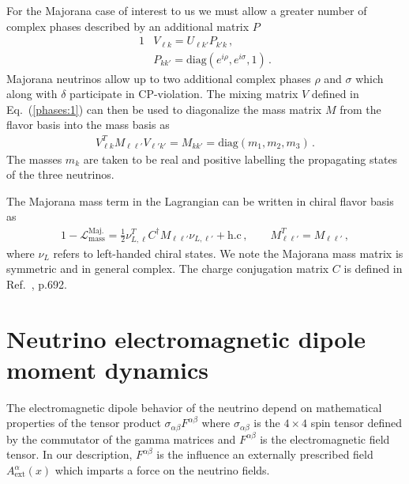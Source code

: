 \documentclass[addchapnum]{ws-rv961x669} %
\newcommand{\req}[1]{Eq.~(\ref{#1})}
\begin{document}
For the Majorana case of interest to us we must allow a greater number of complex phases described by an additional matrix $P$
\begin{alignat}{1}
	\label{phases:1} &V_{\ell k} = U_{\ell k'}P_{k'k}\,,\\
	\label{phases:3} &P_{kk'} = \mathrm{diag}(e^{i\rho},e^{i\sigma},1)\,.
\end{alignat}
Majorana neutrinos allow up to two additional complex phases $\rho$ and $\sigma$ which along with $\delta$ participate in CP-violation. The mixing matrix $V$ defined in \req{phases:1} can then be used to diagonalize the mass matrix $M$ from the flavor basis into the mass basis as
\begin{align}
    \label{diag:1}
    V_{\ell k}^{T}M_{\ell\ell'}V_{\ell'k'} = M_{kk'} = \mathrm{diag}(m_{1},m_{2},m_{3})\,.
\end{align}
The masses $m_{k}$ are taken to be real and positive labelling the propagating states of the three neutrinos.

The Majorana mass term in the Lagrangian can be written in chiral flavor basis as
\begin{alignat}{1}
	\label{mass:1} -\mathcal{L}_{\mathrm{mass}}^{\mathrm{Maj.}}=\frac{1}{2}\nu_{L,\ell}^{T}C^{\dag}M_{\ell\ell'}\nu_{L,\ell'}+\mathrm{h.c}\,,\qquad
    M_{\ell\ell'}^{T}=M_{\ell\ell'}\,,
\end{alignat}
where $\nu_{L}$ refers to left-handed chiral states. We note the Majorana mass matrix is symmetric and in general complex. The charge conjugation matrix $C$ is defined in Ref.~\cite{Itzykson:1980rh}, p.692.

\section{Neutrino electromagnetic dipole moment dynamics}
\label{sec:numoment}
The electromagnetic dipole behavior of the neutrino depend on mathematical properties of the tensor product $\sigma_{\alpha\beta}F^{\alpha\beta}$ where $\sigma_{\alpha\beta}$ is the $4\times 4$ spin tensor defined by the commutator of the gamma matrices and $F^{\alpha\beta}$ is the electromagnetic field tensor. In our description, $F^{\alpha\beta}$ is the influence an externally prescribed field $A^{\alpha}_\mathrm{ext}(x)$ which imparts a force on the neutrino fields.
\end{document}
